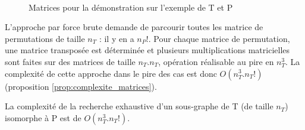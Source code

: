 \begin{figure}[ht]
\begin{center}
  \quad
  \quad
{}\\
\end{center}
\caption{Matrices pour la démonstration sur l'exemple de T et P}
\label{fig:mat-exemplesub}
\end{figure}




L'approche par force brute demande de parcourir toutes les matrice de permutations de taille $n_T$ : il y en a $n_P!$. Pour chaque matrice de permutation, une matrice transposée est déterminée et plusieurs multiplications matricielles sont faites sur des matrices de taille $n_T.n_T$, opération réalisable au pire en $n_T^3$. La complexité de cette approche dans le pire des cas est donc $O(n_T^3.n_T!)$ (proposition \ref{prop:complexite_matrices}).

\begin{prop}
La complexité de la recherche exhaustive d'un sous-graphe de T (de taille $n_T$) isomorphe à P est de $O(n_T^3.n_T!)$.
\label{prop:complexite_matrices}
\end{prop}



